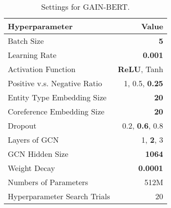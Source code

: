 \documentclass[11pt,a4paper]{article}
\begin{document}
\begin{table}[!htbp]
\centering
\begin{tabular}{lr}
\hline
\textbf{Hyperparameter} & Value\\
\hline
Batch Size & \textbf{5}\\
Learning Rate  & \textbf{0.001} \\
Activation Function &  \textbf{ReLU}, Tanh \\
Positive v.s. Negative Ratio & 1, 0.5, \textbf{0.25} \\
Entity Type Embedding Size & \textbf{20} \\
Coreference Embedding Size & \textbf{20} \\
Dropout & 0.2, \textbf{0.6}, 0.8 \\
Layers of GCN & 1, \textbf{2}, 3 \\
GCN Hidden Size & \textbf{1064} \\
Weight Decay & \textbf{0.0001} \\
\hline \hline
Numbers of Parameters &  512M \\ Hyperparameter Search Trials & 20 \\
\hline
\end{tabular}
\caption{Settings for GAIN-BERT.}
\label{tab:hyperparam3}
\end{table}
 
\end{document}
